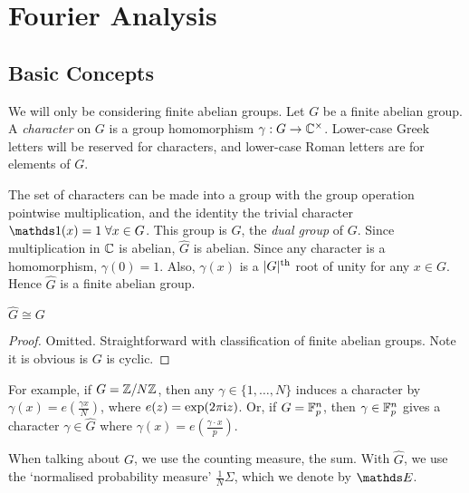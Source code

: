 \documentclass[10pt,a4paper]{article}
\begin{document}
\section{Fourier Analysis}
\subsection{Basic Concepts}
We will only be considering finite abelian groups. Let $G$ be a finite abelian group. A \emph{character} on $G$ is a group homomorphism $\gamma:G \to \mathbb{C}^\times$. Lower-case Greek letters will be reserved for characters, and lower-case Roman letters are for elements of $G$.

The set of characters can be made into a group with the group operation pointwise multiplication, and the identity the trivial character $\one(x) = 1 \forall x \in G$. This group is $\hat{G}$, the \emph{dual group} of $G$. Since multiplication in $\mathbb{C}$ is abelian, $\hat{G}$ is abelian. Since any character is a homomorphism, $\gamma(0) = 1$. Also, $\gamma(x)$ is a $|G|\textsuperscript{th}$ root of unity for any $x \in G$. Hence $\hat{G}$ is a finite abelian group.
\begin{lemma}
  $\hat{G}\cong G$
\end{lemma}
\begin{proof}
  Omitted. Straightforward with classification of finite abelian groups. Note it is obvious is $G$ is cyclic.
\end{proof}
For example, if $G = \mathbb{Z}/N\mathbb{Z}$, then any $\gamma \in \{1, \ldots, N\}$ induces a character by $\gamma(x) = e\left(\frac{\gamma x}{N}\right)$, where $e(z) = \exp(2\pi\mathfrak{i} z)$. Or, if $G = \mathbb{F}_p^n$, then $\gamma \in \mathbb{F}_p^n$ gives a character $\gamma \in \hat{G}$ where $\gamma(x) = e\left(\frac{\gamma\cdot x}{p}\right)$.

When talking about $G$, we use the counting measure, the sum. With $\hat{G}$, we use the `normalised probability measure' $\frac{1}{N}\Sigma$, which we denote by $\E$.
\end{document}
